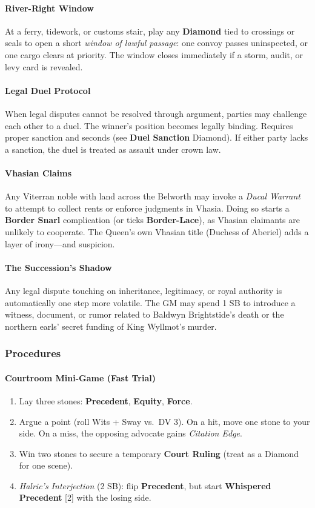 \paragraph{River-Right Window}
At a ferry, tidework, or customs stair, play any \textbf{Diamond} tied to crossings or seals to open a short \emph{window of lawful passage}: one convoy passes uninspected, or one cargo clears at priority. The window closes immediately if a storm, audit, or levy card is revealed.

\paragraph{Legal Duel Protocol}
When legal disputes cannot be resolved through argument, parties may challenge each other to a duel. The winner's position becomes legally binding. Requires proper sanction and seconds (see \textbf{Duel Sanction} Diamond). If either party lacks a sanction, the duel is treated as assault under crown law.

\paragraph{Vhasian Claims}
Any Viterran noble with land across the Belworth may invoke a \emph{Ducal Warrant} to attempt to collect rents or enforce judgments in Vhasia. Doing so starts a \textbf{Border Snarl} complication (or ticks \textbf{Border-Lace}), as Vhasian claimants are unlikely to cooperate. The Queen's own Vhasian title (Duchess of Aberiel) adds a layer of irony---and suspicion.

\paragraph{The Succession's Shadow}
Any legal dispute touching on inheritance, legitimacy, or royal authority is automatically one step more volatile. The GM may spend 1 SB to introduce a witness, document, or rumor related to Baldwyn Brightstide's death or the northern earls' secret funding of King Wyllmot's murder.

\subsubsection{Procedures}

\paragraph{Courtroom Mini-Game (Fast Trial)}
\begin{enumerate}[nosep]
  \item Lay three stones: \textbf{Precedent}, \textbf{Equity}, \textbf{Force}.
  \item Argue a point (roll Wits + Sway vs.\ DV 3). On a hit, move one stone to your side. On a miss, the opposing advocate gains \emph{Citation Edge}.
  \item Win two stones to secure a temporary \textbf{Court Ruling} (treat as a Diamond for one scene).
  \item \emph{Halric's Interjection} (2 SB): flip \textbf{Precedent}, but start \textbf{Whispered Precedent} [2] with the losing side.
\end{enumerate}

